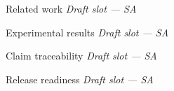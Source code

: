 \begin{frame}{Related work}
  \centering\textit{Draft slot --- SA}
\end{frame}
\begin{frame}{Experimental results}
  \centering\textit{Draft slot --- SA}
\end{frame}
\begin{frame}{Claim traceability}
  \centering\textit{Draft slot --- SA}
\end{frame}
\begin{frame}{Release readiness}
  \centering\textit{Draft slot --- SA}
\end{frame}
